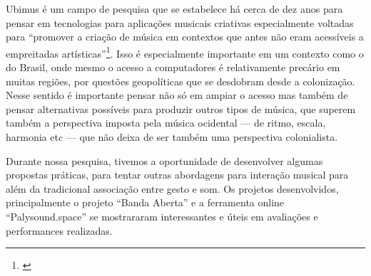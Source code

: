 Ubimus é um campo de pesquisa que se estabelece há cerca de dez anos para pensar em tecnologias para aplicações musicais criativas especialmente voltadas para ``promover a criação de música em contextos que antes não eram acessíveis a empreitadas artísticas''\footnote{\cite{Keller2018}}. Isso é especialmente importante em um contexto como o do Brasil, onde mesmo o acesso a computadores é relativamente precário em muitas regiões, por questões geopolíticas que se desdobram desde a colonização. Nesse sentido é importante pensar não só em ampiar o acesso mas também de pensar alternativas possíveis para produzir outros tipos de música, que superem também a perspectiva imposta pela música ocidental --- de ritmo, escala, harmonia etc --- que não deixa de ser também uma perspectiva colonialista.


Durante nossa pesquisa, tivemos a oportunidade de desenvolver algumas propostas práticas, para tentar outras abordagens para interação musical para além da tradicional associação entre gesto e som. Os projetos desenvolvidos, principalmente o projeto ``Banda Aberta'' e a ferramenta online ``Palysound.space'' se mostrararam interessantes e úteis em avaliações e performances realizadas. 


